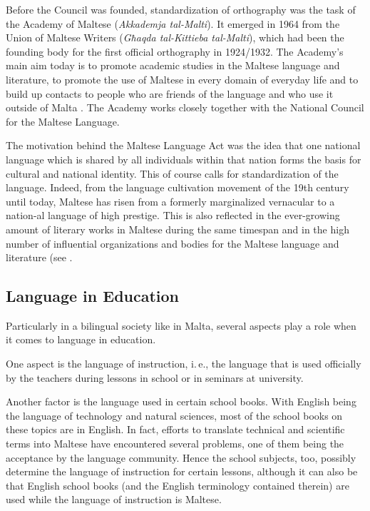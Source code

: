 \documentclass[]{../../metanetpaper}
\begin{document}
\begin{multicols}{2}
Before the Council was founded, standardization of orthography was the task of the Academy of Maltese (\emph{Akkademja tal-Malti}). It emerged in 1964 from the Union of Maltese Writers (\emph{Għaqda tal-Kittieba tal-Malti}), which had been the founding body for the first official orthography in 1924/1932. The Academy's main aim today is to promote academic studies in the Maltese language and literature, to promote the use of Maltese in every domain of everyday life and to build up contacts to people who are friends of the language and who use it outside of Malta \cite{Akkademja1}. The Academy works closely together with the National Council for the Maltese Language.

The motivation behind the Maltese Language Act was the idea that one national language which is shared by all individuals within that nation forms the basis for cultural and national identity. This of course calls for standardization of the language. Indeed, from the language cultivation movement of the 19th century until today, Maltese has risen from a formerly marginalized vernacular to a nation-al language of high prestige. This is also reflected in the ever-growing amount of literary works in Maltese during the same timespan and in the high number of influential organizations and bodies for the Maltese language and literature (see \cite{Fabri:2011a}.


\subsection{Language in Education}

Particularly in a bilingual society like in Malta, several aspects play a role when it comes to language in education. 

One aspect is the language of instruction, i.\,e., the language that is used officially by the teachers during lessons in school or in seminars at university. 

Another factor is the language used in certain school books. With English being the language of technology and natural sciences, most of the school books on these topics are in English. In fact, efforts to translate technical and scientific terms into Maltese have encountered several problems, one of them being the acceptance by the language community. Hence the school subjects, too, possibly determine the language of instruction for certain lessons, although it can also be that English school books (and the English terminology contained therein) are used while the language of instruction is Maltese.


\end{multicols}
\end{document}
